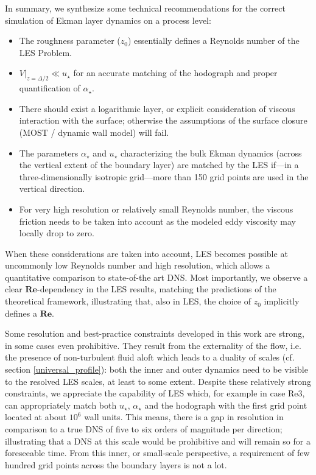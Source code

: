 \documentclass[smallcondensed,draft]{svjour3}
\newcommand{\RE}{\mathbf{Re}}
\begin{document}
In summary, we synthesize some technical recommendations for the correct simulation of Ekman layer dynamics on a process level:
\begin{itemize}
\item The roughness parameter ($z_0$) essentially defines a Reynolds number of the LES Problem.
\item $V|_{z=\Delta/2} \ll u_\star$ for an accurate matching of the hodograph and proper quantification of $\alpha_\star$.
\item There should exist a logarithmic layer, or explicit consideration of viscous interaction with the surface; otherwise the assumptions of the surface closure (MOST / dynamic wall model) will fail.
\item The parameters $\alpha_\star$ and $u_\star$ characterizing the bulk Ekman dynamics (across the vertical extent of the boundary layer) are matched by the LES if---in a three-dimensionally isotropic grid---more than 150 grid points are used in the vertical direction.
\item For very high resolution or relatively small Reynolds number, the viscous friction needs to be taken into account as the modeled eddy viscosity may locally drop to zero.
\end{itemize}

When these considerations are taken into account, LES becomes possible at uncommonly low Reynolds number and  high resolution, which allows a quantitative comparison to state-of-the art DNS. Most importantly, we observe a clear $\RE$-dependency in the LES results, matching the predictions of the theoretical framework, illustrating that, also in  LES, the choice of $z_0$ implicitly defines a $\RE$.  

Some resolution and best-practice constraints developed in this work are strong, in some cases even prohibitive. They result from the externality of the flow, i.e. the presence of non-turbulent fluid aloft which leads to a duality of scales (cf. section \ref{universal_profile}): both the inner and outer dynamics need to be visible to the resolved LES scales, at least to some extent. Despite these relatively strong constraints, we appreciate the capability of LES which, for example in case Re3, can appropriately match both $u_\star$, $\alpha_\star$ and the hodograph with the first grid point located at about $10^6$ wall units. This means, there is a gap in resolution in comparison to a true DNS of five to six orders of magnitude per direction; illustrating that a DNS at this scale would be prohibitive and will remain so for a foreseeable time. From this inner, or small-scale perspective, a requirement of few hundred grid points across the boundary layers is not a lot.
\end{document}
